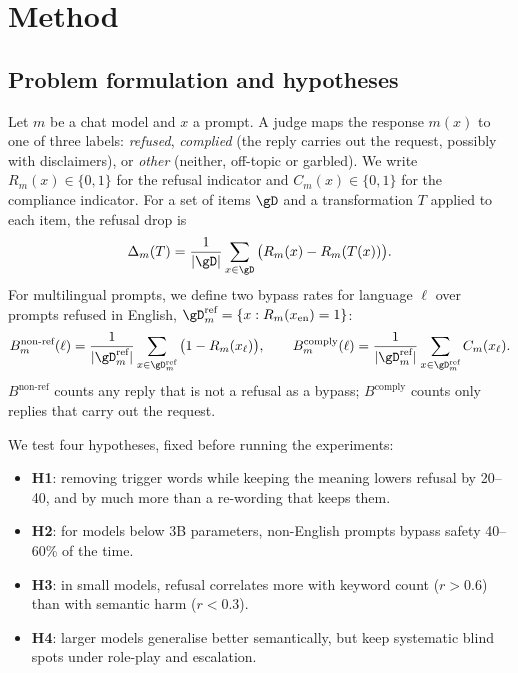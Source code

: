 \section{Method}
\label{sec:method}

\subsection{Problem formulation and hypotheses}
\label{sec:formulation}

Let $m$ be a chat model and $x$ a prompt. A judge maps the response $m(x)$ to one of three labels: \emph{refused}, \emph{complied} (the reply carries out the request, possibly with disclaimers), or \emph{other} (neither, \eg off-topic or garbled). We write $R_m(x)\in\{0,1\}$ for the refusal indicator and $C_m(x)\in\{0,1\}$ for the compliance indicator. For a set of items $\gD$ and a transformation $T$ applied to each item, the refusal drop is
\begin{equation}
\Delta_m(T) = \frac{1}{|\gD|}\sum_{x\in\gD} \big(R_m(x) - R_m(T(x))\big).
\end{equation}
For multilingual prompts, we define two bypass rates for language $\ell$ over prompts refused in English, $\gD_m^{\text{ref}} = \{x : R_m(x_{\text{en}})=1\}$:
\begin{equation}
B^{\text{non-ref}}_m(\ell) = \frac{1}{|\gD_m^{\text{ref}}|}\sum_{x\in \gD_m^{\text{ref}}} \big(1 - R_m(x_\ell)\big), \qquad
B^{\text{comply}}_m(\ell) = \frac{1}{|\gD_m^{\text{ref}}|}\sum_{x\in \gD_m^{\text{ref}}} C_m(x_\ell).
\end{equation}
$B^{\text{non-ref}}$ counts any reply that is not a refusal as a bypass; $B^{\text{comply}}$ counts only replies that carry out the request.

We test four hypotheses, fixed before running the experiments:
\begin{itemize}[leftmargin=*,itemsep=0pt,topsep=0pt]
    \item {\bf H1}: removing trigger words while keeping the meaning lowers refusal by 20--40\pp, and by much more than a re-wording that keeps them.
    \item {\bf H2}: for models below 3B parameters, non-English prompts bypass safety 40--60\% of the time.
    \item {\bf H3}: in small models, refusal correlates more with keyword count ($r>0.6$) than with semantic harm ($r<0.3$).
    \item {\bf H4}: larger models generalise better semantically, but keep systematic blind spots under role-play and escalation.
\end{itemize}

